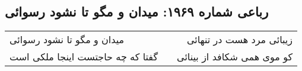 \begin{center}
\section*{رباعی شماره ۱۹۶۹: میدان و مگو تا نشود رسوائی}
\label{sec:1969}
\begin{longtable}{l p{0.5cm} r}
میدان و مگو تا نشود رسوائی
&&
زیبائی مرد هست در تنهائی
\\
گفتا که چه حاجتست اینجا ملکی است
&&
کو موی همی شکافد از بینائی
\\
\end{longtable}
\end{center}
